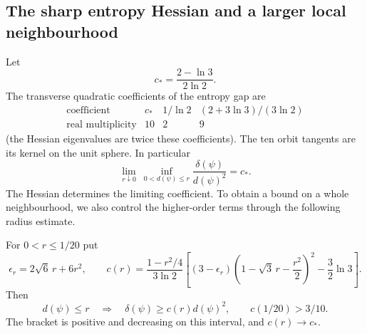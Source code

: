 \subsection{The sharp entropy Hessian and a larger local neighbourhood}
\label{sec:fqe-entropy-orbit-local}
Let
\[
 c_* =\frac{2-\ln3}{2\ln2}.
\]
The transverse quadratic coefficients of the entropy gap are
\begin{equation}\label{eq:fqe-entropy-hessian-spectrum}
 \begin{array}{c|ccc}
 \text{coefficient}&c_*&1/\ln2&(2+3\ln3)/(3\ln2)\\\hline
 \text{real multiplicity}&10&2&9
 \end{array}
\end{equation}
(the Hessian eigenvalues are twice these coefficients). The ten orbit
tangents are its kernel on the unit sphere. In particular
\begin{equation}\label{eq:fqe-entropy-local-sharp}
 \lim_{r\downarrow0}\ \inf_{0<d(\psi)\le r}
                  \frac{\delta(\psi)}{d(\psi)^2}=c_*.
\end{equation}
The Hessian determines the limiting coefficient. To obtain a bound on a whole neighbourhood, we also
control the higher-order terms through the following radius estimate.
\begin{lemma}\label{lem:fqe-entropy-local-radius}
For $0<r\le1/20$ put
\[
 \epsilon_r=2\sqrt6\,r+6r^2,\qquad
 c(r)=\frac{1-r^2/4}{3\ln2}
 \left[(3-\epsilon_r)
       \left(1-\sqrt3\,r-\frac{r^2}2\right)^2
       -\frac32\ln3\right].
\]
Then
\begin{equation}\label{eq:fqe-entropy-local-radius}
 d(\psi)\le r\quad\Longrightarrow\quad
 \delta(\psi)\ge c(r)d(\psi)^2,\qquad c(1/20)>3/10.
\end{equation}
The bracket is positive and decreasing on this interval, and
$c(r)\to c_*$.
\end{lemma}

